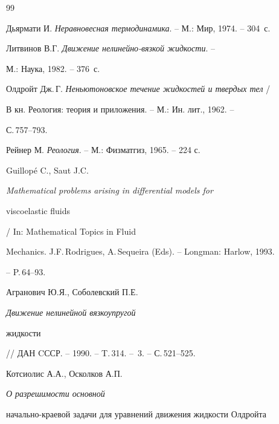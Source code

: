\begin{thebibliography}{99}







Дьярмати И. {\em Неравновесная термодинамика}. -- М.: Мир, 1974. -- 304~с.







Литвинов В.Г. {\em Движение нелинейно-вязкой жидкости}. --


М.: Наука, 1982. -- 376~с.







Олдройт Дж.\,Г. {\em Неньютоновское течение жидкостей и твердых тел} / 


В кн. Реология: теория и приложения. -- М.: Ин. лит., 1962. --


С.\,757--793.







Рейнер М. {\em Реология}. -- М.: Физматгиз, 1965. -- 224 с.







Guillop\'{e} C., Saut J.C. 


{\em Mathematical problems arising in differential models for 


viscoelastic fluids} / In: Mathematical Topics in Fluid


Mechanics. J.F.\,Rodrigues, A.\,Sequeira (Eds). -- Longman: Harlow, 1993.


-- P.\,64--93.







Агранович Ю.Я., Соболевский П.Е. {\em Движение нелинейной вязкоупругой 


жидкости} // ДАН CССР. -- 1990. -- T.\,314. -- \No\,3. -- С.\,521--525.







Котсиолис А.А., Осколков А.П. {\em О разрешимости основной


начально-краевой задачи для уравнений движения жидкости Олдройта


}
\end{thebibliography}
